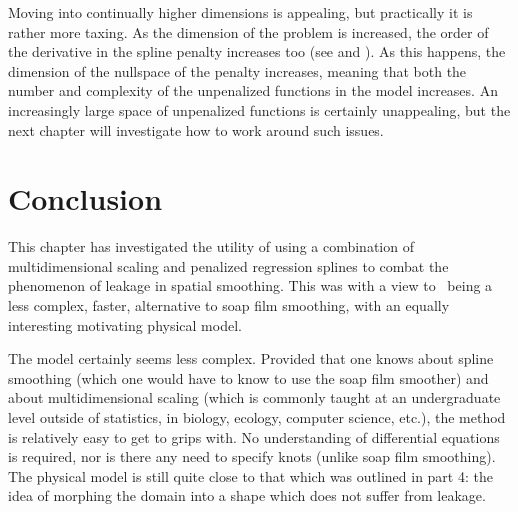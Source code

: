 Moving into continually higher dimensions is appealing, but practically it is rather more taxing. As the dimension of the problem is increased, the order of the derivative in the spline penalty increases too (see  and ). As this happens, the dimension of the nullspace of the penalty increases, meaning that both the number and complexity of the unpenalized functions in the model increases. An increasingly large space of unpenalized functions is certainly unappealing, but the next chapter will investigate how to work around such issues.

\section{Conclusion}
\label{mds-conc}

This chapter has investigated the utility of using a combination of multidimensional scaling and penalized regression splines to combat the phenomenon of leakage in spatial smoothing. This was with a view to \mdsap\ being a less complex, faster, alternative to soap film smoothing, with an equally interesting motivating physical model.

The model certainly seems less complex. Provided that one knows about spline smoothing (which one would have to know to use the soap film smoother) and about multidimensional scaling (which is commonly taught at an undergraduate level outside of statistics, in biology, ecology, computer science, etc.), the method is relatively easy to get to grips with. No understanding of differential equations is required, nor is there any need to specify knots (unlike soap film smoothing). The physical model is still quite close to that which was outlined in  part 4: the idea of morphing the domain into a shape which does not suffer from leakage.

